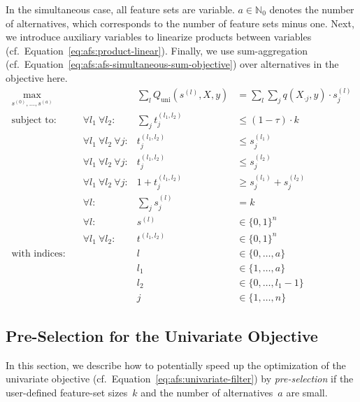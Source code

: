 \documentclass{article}
\theoremstyle{definition}
\begin{document}
In the simultaneous case, all feature sets are variable.
$a \in \mathbb{N}_0$ denotes the number of alternatives, which corresponds to the number of feature sets minus one.
Next, we introduce auxiliary variables to linearize products between variables (cf.~Equation~\ref{eq:afs:product-linear}).
Finally, we use sum-aggregation (cf.~Equation~\ref{eq:afs:afs-simultaneous-sum-objective}) over alternatives in the objective here.
%
\begin{equation}
	\begin{aligned}
		\max_{s^{(0)}, \dots, s^{(a)}} &\quad & \sum_l Q_{\text{uni}}(s^{(l)},X,y) &= \sum_l \sum_j q(X_{\cdot{}j},y) \cdot s^{(l)}_j\\
		\text{subject to:} &\quad \forall l_1~\forall l_2: & \sum_j t^{(l_1,l_2)}_j &\leq (1 - \tau) \cdot k \\
		&\quad \forall l_1~\forall l_2~\forall j: & t^{(l_1,l_2)}_j &\leq s^{(l_1)}_j \\
		&\quad \forall l_1~\forall l_2~\forall j: & t^{(l_1,l_2)}_j &\leq s^{(l_2)}_j \\
		&\quad \forall l_1~\forall l_2~\forall j: & 1 + t^{(l_1,l_2)}_j &\geq s^{(l_1)}_j + s^{(l_2)}_j \\
		&\quad \forall l: & \sum_j s^{(l)}_j &= k \\
		&\quad \forall l: & s^{(l)} &\in \{0,1\}^n \\
		&\quad \forall l_1~\forall l_2: & t^{(l_1,l_2)} &\in \{0,1\}^n \\
		\text{with indices:} &\quad & l &\in \{0, \dots, a\} \\
		&\quad & l_1 &\in \{1, \dots, a\} \\
		&\quad & l_2 &\in \{0, \dots, l_1-1\} \\
		&\quad & j &\in \{1, \dots, n\}
	\end{aligned}
	\label{eq:afs:afs-simultaneous-complete}
\end{equation}

\subsection{Pre-Selection for the Univariate Objective}
\label{sec:afs:appendix:univariate-pre-selection}

In this section, we describe how to potentially speed up the optimization of the univariate objective (cf.~Equation~\ref{eq:afs:univariate-filter}) by \emph{pre-selection} if the user-defined feature-set sizes~$k$ and the number of alternatives~$a$ are small.
\end{document}
